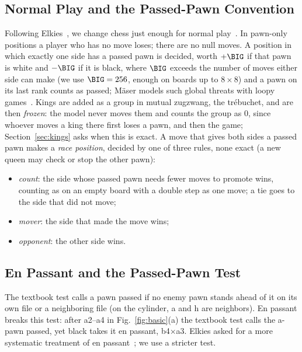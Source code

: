 \subsection{Normal Play and the Passed-Pawn Convention}
Following Elkies~\cite{Elkies1996}, we change chess just enough for normal play~\cite{WinningWays}. In pawn-only
positions a player who has no move loses; there are no null moves. A position in which exactly one side has a
passed pawn is decided, worth $+\BIG$ if that pawn is white and $-\BIG$ if it is black, where $\BIG$ exceeds the number of moves
either side can make (we use $\BIG=256$, enough on boards up to $8\times8$) and a pawn on its last rank counts as passed; M\"aser models such global threats with loopy
games~\cite{Maeser2002}. Kings are added as a group in mutual zugzwang, the tr\'ebuchet, and are then
\emph{frozen}: the model never moves them and counts the group as $0$, since whoever moves a king there first
loses a pawn, and then the game; Section~\ref{sec:kings} asks when this is exact. A move that gives both sides a
passed pawn makes a \emph{race position}, decided by one of three rules, none exact (a new queen may check or
stop the other pawn):
\begin{itemize}
\item \emph{count}: the side whose passed pawn needs fewer moves to promote wins, counting as on an empty
  board with a double step as one move; a tie goes to the side that did not move;
\item \emph{mover}: the side that made the move wins;
\item \emph{opponent}: the other side wins.
\end{itemize}

\subsection{En Passant and the Passed-Pawn Test}\label{sec:ep}
The textbook test calls a pawn passed if no enemy pawn stands ahead of it on its own file or a neighboring file
(on the cylinder, a and h are neighbors). En passant breaks this test: after a2--a4 in Fig.~\ref{fig:basic}(a)
the textbook test calls the a-pawn passed, yet black takes it en passant, b4$\times$a3. Elkies asked for a
more systematic treatment of en passant~\cite{Elkies1996}; we use a stricter test.

